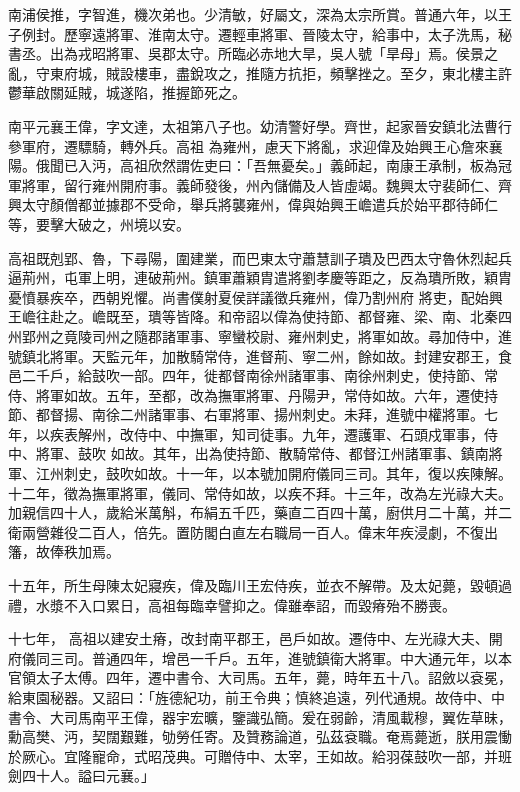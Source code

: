 \begin{pinyinscope}
 南浦侯推，字智進，機次弟也。少清敏，好屬文，深為太宗所賞。普通六年，以王子例封。歷寧遠將軍、淮南太守。遷輕車將軍、晉陵太守，給事中，太子洗馬，秘書丞。出為戎昭將軍、吳郡太守。所臨必赤地大旱，吳人號「旱母」焉。侯景之亂，守東府城，賊設樓車，盡銳攻之，推隨方抗拒，頻擊挫之。至夕，東北樓主許鬱華啟關延賊，城遂陷，推握節死之。



 南平元襄王偉，字文達，太祖第八子也。幼清警好學。齊世，起家晉安鎮北法曹行參軍府，遷驃騎，轉外兵。高祖
 為雍州，慮天下將亂，求迎偉及始興王心詹來襄陽。俄聞已入沔，高祖欣然謂佐吏曰：「吾無憂矣。」義師起，南康王承制，板為冠軍將軍，留行雍州開府事。義師發後，州內儲備及人皆虛竭。魏興太守裴師仁、齊興太守顏僧都並據郡不受命，舉兵將襲雍州，偉與始興王嶦遣兵於始平郡待師仁等，要擊大破之，州境以安。



 高祖既剋郢、魯，下尋陽，圍建業，而巴東太守蕭慧訓子璝及巴西太守魯休烈起兵逼荊州，屯軍上明，連破荊州。鎮軍蕭穎胄遣將劉孝慶等距之，反為璝所敗，穎胄憂憤暴疾卒，西朝兇懼。尚書僕射夏侯詳議徵兵雍州，偉乃割州府
 將吏，配始興王嶦往赴之。嶦既至，璝等皆降。和帝詔以偉為使持節、都督雍、梁、南、北秦四州郢州之竟陵司州之隨郡諸軍事、寧蠻校尉、雍州刺史，將軍如故。尋加侍中，進號鎮北將軍。天監元年，加散騎常侍，進督荊、寧二州，餘如故。封建安郡王，食邑二千戶，給鼓吹一部。四年，徙都督南徐州諸軍事、南徐州刺史，使持節、常侍、將軍如故。五年，至都，改為撫軍將軍、丹陽尹，常侍如故。六年，遷使持節、都督揚、南徐二州諸軍事、右軍將軍、揚州刺史。未拜，進號中權將軍。七年，以疾表解州，改侍中、中撫軍，知司徒事。九年，遷護軍、石頭戍軍事，侍中、將軍、鼓吹
 如故。其年，出為使持節、散騎常侍、都督江州諸軍事、鎮南將軍、江州刺史，鼓吹如故。十一年，以本號加開府儀同三司。其年，復以疾陳解。十二年，徵為撫軍將軍，儀同、常侍如故，以疾不拜。十三年，改為左光祿大夫。加親信四十人，歲給米萬斛，布絹五千匹，藥直二百四十萬，廚供月二十萬，并二衛兩營雜役二百人，倍先。置防閣白直左右職局一百人。偉末年疾浸劇，不復出籓，故俸秩加焉。



 十五年，所生母陳太妃寢疾，偉及臨川王宏侍疾，並衣不解帶。及太妃薨，毀頓過禮，水漿不入口累日，高祖每臨幸譬抑之。偉雖奉詔，而毀瘠殆不勝喪。



 十七年，
 高祖以建安土瘠，改封南平郡王，邑戶如故。遷侍中、左光祿大夫、開府儀同三司。普通四年，增邑一千戶。五年，進號鎮衛大將軍。中大通元年，以本官領太子太傅。四年，遷中書令、大司馬。五年，薨，時年五十八。詔斂以袞冕，給東園秘器。又詔曰：「旌德紀功，前王令典；慎終追遠，列代通規。故侍中、中書令、大司馬南平王偉，器宇宏曠，鑒識弘簡。爰在弱齡，清風載穆，翼佐草昧，勳高樊、沔，契闊艱難，劬勞任寄。及贊務論道，弘茲袞職。奄焉薨逝，朕用震慟於厥心。宜隆寵命，式昭茂典。可贈侍中、太宰，王如故。給羽葆鼓吹一部，并班劍四十人。謚曰元襄。」




\end{pinyinscope}
